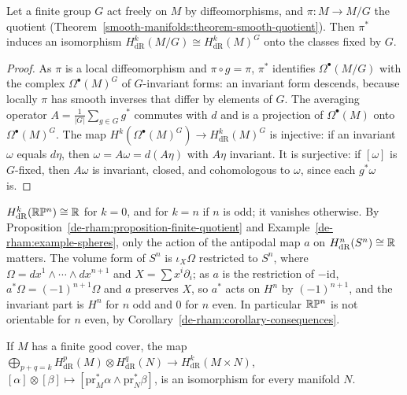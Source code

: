 \begin{proposition}\label{de-rham:proposition-finite-quotient}
Let a finite group $G$ act freely on $M$ by diffeomorphisms, and $\pi \colon M \to M/G$ the quotient (Theorem~\ref{smooth-manifolds:theorem-smooth-quotient}). Then $\pi^*$ induces an isomorphism
$H^k_{\mathrm{dR}}(M/G) \cong H^k_{\mathrm{dR}}(M)^G$ onto the classes fixed by $G$.
\end{proposition}

\begin{proof}
As $\pi$ is a local diffeomorphism and $\pi \circ g = \pi$, $\pi^*$ identifies $\Omega^\bullet(M/G)$ with the complex $\Omega^\bullet(M)^G$ of $G$-invariant forms: an invariant form descends, because locally $\pi$ has smooth inverses that differ
by elements of $G$. The averaging operator $A = \frac{1}{|G|}\sum_{g \in G}g^*$ commutes with $d$ and is a projection of $\Omega^\bullet(M)$ onto $\Omega^\bullet(M)^G$. The map $H^k(\Omega^\bullet(M)^G) \to H^k_{\mathrm{dR}}(M)^G$ is injective: if an
invariant $\omega$ equals $d\eta$, then $\omega = A\omega = d(A\eta)$ with $A\eta$ invariant. It is surjective: if $[\omega]$ is $G$-fixed, then $A\omega$ is invariant, closed, and cohomologous to $\omega$, since each $g^*\omega$ is.
\end{proof}

\begin{example}\label{de-rham:example-real-projective}
$H^k_{\mathrm{dR}}(\mathbb{R}\mathbb{P}^n) \cong \mathbb{R}$ for $k = 0$, and for $k = n$ if $n$ is odd; it vanishes otherwise. By Proposition~\ref{de-rham:proposition-finite-quotient} and Example~\ref{de-rham:example-spheres}, only the action of the
antipodal map $a$ on $H^n_{\mathrm{dR}}(S^n) \cong \mathbb{R}$ matters. The volume form of $S^n$ is $\iota_X\Omega$ restricted to $S^n$, where $\Omega = dx^1 \wedge \cdots \wedge dx^{n+1}$ and $X = \sum x^i\partial_i$; as $a$ is the restriction of $-\mathrm{id}$,
$a^*\Omega = (-1)^{n+1}\Omega$ and $a$ preserves $X$, so $a^*$ acts on $H^n$ by $(-1)^{n+1}$, and the invariant part is $H^n$ for $n$ odd and $0$ for $n$ even. In particular $\mathbb{R}\mathbb{P}^n$ is not orientable for $n$ even, by
Corollary~\ref{de-rham:corollary-consequences}.
\end{example}

\begin{theorem}\label{de-rham:theorem-kunneth}
If $M$ has a finite good cover, the map $\bigoplus_{p+q=k}H^p_{\mathrm{dR}}(M) \otimes H^q_{\mathrm{dR}}(N) \to H^k_{\mathrm{dR}}(M \times N)$, $[\alpha] \otimes [\beta] \mapsto [\mathrm{pr}_M^*\alpha \wedge \mathrm{pr}_N^*\beta]$, is an isomorphism for every
manifold $N$.
\end{theorem}

